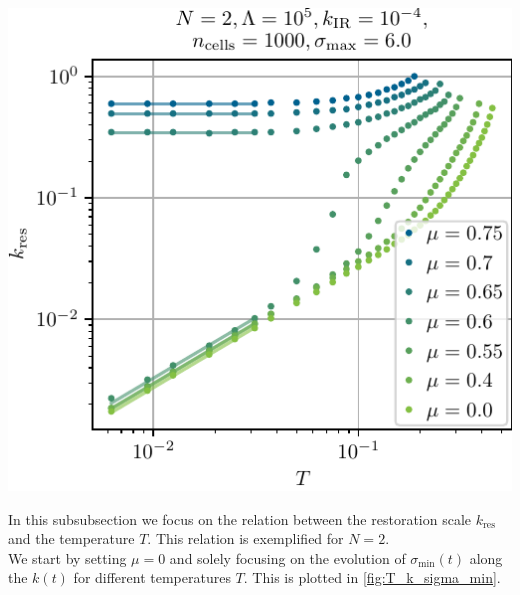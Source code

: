 	{%
		\includegraphics[width=\subcaptionFigureWidth]{gn/figures/T_k_restored.pdf} %
		\captionsetup{width=\subcaptionFigureWidth}%
		\caption{%
			Restoration scale $k_\mathrm{res}$, where the \ZII{} symmetry is restored during the \frg{} flow, as a function of temperature $T$ for a constant number of fermionic flavors $N = 2$ and various values of $\mu$. The points corresponding to ${\mu = 0.65}$, ${\mu = 0.7}$, and ${\mu = 0.75}$ correspond to regions in the $\mu$-$T$-plane, where the \ZII{} symmetry is restored by the chemical potential, already before bosonic fluctuations are active, \cf{} \cref{fig:phase_boundaries}. For temperatures larger than the points, which are shown in the plot, there is never symmetry breaking throughout the entire \frg{} flow. For $T\smallerlesssim 0.03$ we plot $k_{\mathrm{res}}(T) \propto T^{0}$ for $\mu>0.6$ and $k_{\mathrm{res}}(T) \propto T$ for $\mu<0.6$ ought to be used for optical guidance.
		}%
		\label{fig:T_k_restored}
	}%

	In this subsubsection we focus on the relation between the restoration scale $k_\mathrm{res}$ and the temperature $T$. This relation is exemplified for $N = 2$.\\
	
	We start by setting $\mu = 0$ and solely focusing on the evolution of $\sigma_\mathrm{min} ( t )$ along the \rgscale{} $k ( t )$ for different temperatures $T$. This is plotted in \cref{fig:T_k_sigma_min}.

